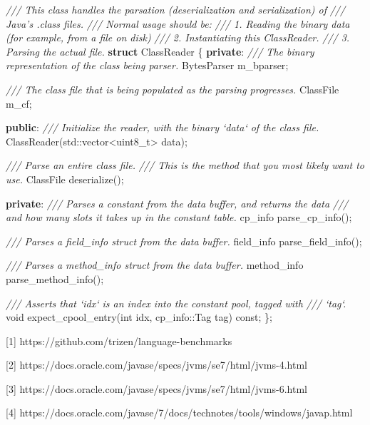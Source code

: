 \documentclass[]{article}
\newenvironment{Shaded}{}{}
\newcommand{\KeywordTok}[1]{\textcolor[rgb]{0.00,0.44,0.13}{\textbf{#1}}}
\newcommand{\DataTypeTok}[1]{\textcolor[rgb]{0.56,0.13,0.00}{#1}}
\newcommand{\CommentTok}[1]{\textcolor[rgb]{0.38,0.63,0.69}{\textit{#1}}}
\newcommand{\VariableTok}[1]{\textcolor[rgb]{0.10,0.09,0.49}{#1}}
\newcommand{\BuiltInTok}[1]{#1}
\newcommand{\AttributeTok}[1]{\textcolor[rgb]{0.49,0.56,0.16}{#1}}
\newcommand{\NormalTok}[1]{#1}
\begin{document}
\begin{Shaded}
\begin{Highlighting}[]
\CommentTok{/// This class handles the parsation (deserialization and serialization) of}
\CommentTok{/// Java's .class files.}
\CommentTok{/// Normal usage should be:}
\CommentTok{/// 1. Reading the binary data (for example, from a file on disk)}
\CommentTok{/// 2. Instantiating this ClassReader.}
\CommentTok{/// 3. Parsing the actual file.}
\KeywordTok{struct}\NormalTok{ ClassReader \{}
  \KeywordTok{private}\NormalTok{:}
    \CommentTok{/// The binary representation of the class being parser.}
\NormalTok{    BytesParser }\VariableTok{m_bparser}\NormalTok{;}

    \CommentTok{/// The class file that is being populated as the parsing progresses.}
\NormalTok{    ClassFile }\VariableTok{m_cf}\NormalTok{;}

  \KeywordTok{public}\NormalTok{:}
    \CommentTok{/// Initialize the reader, with the binary `data` of the class file.}
\NormalTok{    ClassReader(}\BuiltInTok{std::}\NormalTok{vector<}\DataTypeTok{uint8_t}\NormalTok{> data);}

    \CommentTok{/// Parse an entire class file.}
    \CommentTok{/// This is the method that you most likely want to use.}
\NormalTok{    ClassFile deserialize();}

  \KeywordTok{private}\NormalTok{:}
    \CommentTok{/// Parses a constant from the data buffer, and returns the data}
    \CommentTok{/// and how many slots it takes up in the constant table.}
\NormalTok{    cp_info parse_cp_info();}

    \CommentTok{/// Parses a field_info struct from the data buffer.}
\NormalTok{    field_info parse_field_info();}

    \CommentTok{/// Parses a method_info struct from the data buffer.}
\NormalTok{    method_info parse_method_info();}

    \CommentTok{/// Asserts that `idx` is an index into the constant pool, tagged with}
    \CommentTok{/// `tag`.}
    \DataTypeTok{void}\NormalTok{ expect_cpool_entry(}\DataTypeTok{int}\NormalTok{ idx, cp_info::Tag tag) }\AttributeTok{const}\NormalTok{;}
\NormalTok{\};}
\end{Highlighting}
\end{Shaded}

{[}1{]} https://github.com/trizen/language-benchmarks

{[}2{]} https://docs.oracle.com/javase/specs/jvms/se7/html/jvms-4.html

{[}3{]} https://docs.oracle.com/javase/specs/jvms/se7/html/jvms-6.html

{[}4{]}
https://docs.oracle.com/javase/7/docs/technotes/tools/windows/javap.html
\end{document}
